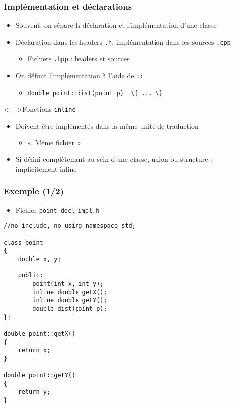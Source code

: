 \begin{frame}
\frametitle{Implémentation et déclarations}
\begin{itemize}[<+->]
\item Souvent, on sépare la déclaration et l'implémentation d'une classe
\item Déclaration dans les headers \texttt{.h}, implémentation dans les sources \texttt{.cpp}
	\begin{itemize}
	\item Fichiers \texttt{.hpp} : headers et sources
	\end{itemize}
\item On définit l'implémentation à l'aide de \texttt{::}
	\begin{itemize}
	\item \lstinline|double point::dist(point p)  \{ ... \}|
	\end{itemize}
\end{itemize}
\begin{exampleblock}<+->{Fonctions \texttt{inline}}
	\begin{itemize}[<+->]
	\item Doivent être implémentés dans la même unité de traduction
		\begin{itemize}
		\item «~Même fichier~»
		\end{itemize}
	\item Si défini complètement au sein d'une classe, union ou structure : implicitement inline
	\end{itemize}
\end{exampleblock}
\end{frame}

\begin{frame}[containsverbatim]
\frametitle{Exemple (1/2)}
\begin{itemize}
\item Fichier \texttt{point-decl-impl.h}
\end{itemize}
\begin{lstlisting}
//no include, no using namespace std;

class point
{
	double x, y;

	public:
		point(int x, int y);
		inline double getX();
		inline double getY();
		double dist(point p);
};

double point::getX()
{
    return x;
}

double point::getY()
{
    return y;
}
\end{lstlisting}
%
%
\end{frame}

